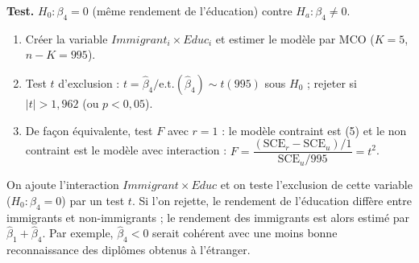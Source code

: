 \documentclass[11pt,a4paper]{article}
\begin{document}
\textbf{Test.} $H_0:\beta_4=0$ (même rendement de l'éducation) contre $H_a:\beta_4\neq0$.
\begin{enumerate}[nosep]
\item Créer la variable $Immigrant_i\times Educ_i$ et estimer le modèle par MCO ($K=5$, $n-K=995$).
\item Test $t$ d'exclusion : $t=\hat\beta_4/\text{e.t.}(\hat\beta_4)\sim t(995)$ sous $H_0$ ; rejeter si $|t|>1{,}962$ (ou $p<0{,}05$).
\item De façon équivalente, test $F$ avec $r=1$ : le modèle contraint est (5) et le non contraint est le modèle avec interaction : $F=\dfrac{(\text{SCE}_r-\text{SCE}_u)/1}{\text{SCE}_u/995}=t^2$.
\end{enumerate}

\begin{reponse}
On ajoute l'interaction $Immigrant\times Educ$ et on teste l'exclusion de cette variable ($H_0:\beta_4=0$) par un test $t$. Si l'on rejette, le rendement de l'éducation diffère entre immigrants et non-immigrants ; le rendement des immigrants est alors estimé par $\hat\beta_1+\hat\beta_4$. Par exemple, $\hat\beta_4<0$ serait cohérent avec une moins bonne reconnaissance des diplômes obtenus à l'étranger.
\end{reponse}
\end{document}
